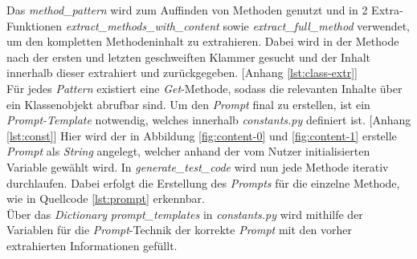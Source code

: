 \vspace{-.3cm}
Das \textit{method\_pattern} wird zum Auffinden von Methoden genutzt und in 2 Extra-Funktionen \textit{extract\_methods\_with\_content} sowie \textit{extract\_full\_method} verwendet, um den kompletten Methodeninhalt zu extrahieren. Dabei wird in der Methode nach der ersten und letzten geschweiften Klammer gesucht und der Inhalt innerhalb dieser extrahiert und zurückgegeben. [Anhang \ref{lst:class-extr}]\\ Für jedes \textit{Pattern} existiert eine \textit{Get}-Methode, sodass die relevanten Inhalte über ein Klassenobjekt abrufbar sind. Um den \textit{Prompt} final zu erstellen, ist ein \textit{Prompt-Template} notwendig, welches innerhalb \textit{constants.py} definiert ist. [Anhang \ref{lst:const}] Hier wird der in Abbildung \ref{fig:content-0} und \ref{fig:content-1} erstelle \textit{Prompt} als \textit{String} angelegt, welcher anhand der vom Nutzer initialisierten Variable gewählt wird. In \textit{generate\_test\_code} wird nun jede Methode iterativ durchlaufen. Dabei erfolgt die Erstellung des \textit{Prompts} für die einzelne Methode, wie in Quellcode \ref{lst:prompt} erkennbar.\\ Über das \textit{Dictionary} \textit{prompt\_templates} in \textit{constants.py} wird mithilfe der Variablen für die \textit{Prompt}-Technik der korrekte \textit{Prompt} mit den vorher extrahierten Informationen gefüllt.\\
\vspace{-.3cm}

